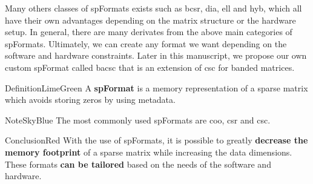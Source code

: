 Many others classes of \glspl{spFormat} exists such as \acrfull{bcsr}, \acrfull{dia}, \acrfull{ell} and \acrfull{hyb}, which all have their own advantages depending on the matrix structure or the hardware setup.
In general, there are many derivates from the above main categories of \glspl{spFormat}.
Ultimately, we can create any format we want depending on the software and hardware constraints.
Later in this manuscript, we propose our own custom \gls{spFormat} called \acrfull{bacsc} that is an extension of \acrshort{csc} for \gls{banded} matrices.

\begin{highlight}{Definition}{LimeGreen}
    A \textbf{\gls{spFormat}} is a memory representation of a sparse matrix which avoids storing zeros by using \gls{metadata}.
\end{highlight}

\begin{highlight}{Note}{SkyBlue}
    The most commonly used \glspl{spFormat} are \acrshort{coo}, \acrshort{csr} and \acrshort{csc}.
\end{highlight}

\begin{highlight}{Conclusion}{Red}
    With the use of \glspl{spFormat}, it is possible to greatly \textbf{decrease the memory footprint} of a sparse matrix while increasing the data dimensions.
    These formats \textbf{can be tailored} based on the needs of the software and hardware.
\end{highlight}